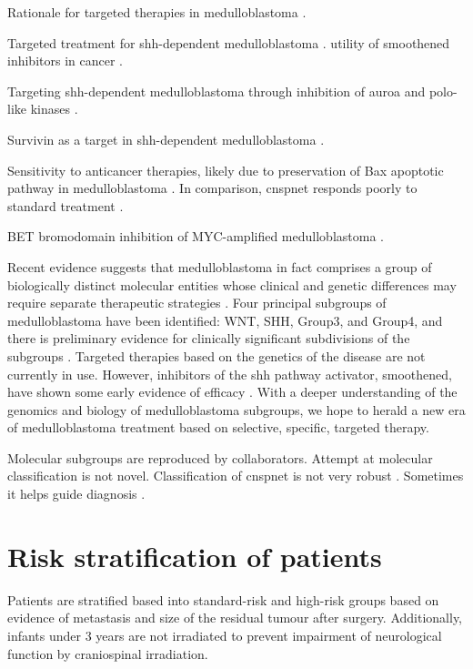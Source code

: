 Rationale for targeted therapies in medulloblastoma .

Targeted treatment for \gls{shh}-dependent medulloblastoma .
utility of smoothened inhibitors in cancer .

Targeting \gls{shh}-dependent medulloblastoma through inhibition of auroa and polo-like kinases .

Survivin as a target in \gls{shh}-dependent medulloblastoma .

Sensitivity to anticancer therapies, likely due to preservation of Bax apoptotic pathway in medulloblastoma .
In comparison, \gls{cnspnet} responds poorly to standard treatment .

BET bromodomain inhibition of MYC-amplified medulloblastoma . 


Recent evidence suggests that medulloblastoma in fact comprises a group of biologically distinct molecular entities whose clinical and genetic differences may require separate therapeutic strategies . Four principal subgroups of medulloblastoma have been identified: WNT, SHH, Group3, and Group4, and there is preliminary evidence for clinically significant subdivisions of the subgroups . Targeted therapies based on the genetics of the disease are not currently in use. However, inhibitors of the \gls{shh} pathway activator, smoothened, have shown some early evidence of efficacy . With a deeper understanding of the genomics and biology of medulloblastoma subgroups, we hope to herald a new era of medulloblastoma treatment based on selective, specific, targeted therapy.

Molecular subgroups are reproduced by collaborators.
Attempt at molecular classification is not novel. Classification of \gls{cnspnet} is not very robust .
Sometimes it helps guide diagnosis .


\section{Risk stratification of patients}

Patients are stratified based into standard-risk and high-risk groups based on evidence of metastasis and size of the residual tumour after surgery. Additionally, infants under 3 years are not irradiated to prevent impairment of neurological function by craniospinal irradiation.


